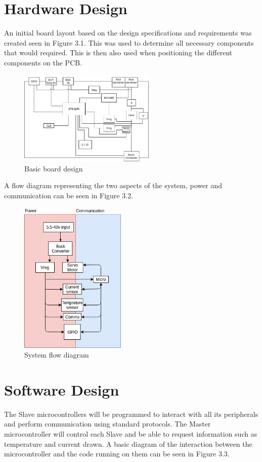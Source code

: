 \section{Hardware Design}
\vspace{-3mm}
An initial board layout based on the design specifications and requirements was created seen in Figure 3.1. This was used to determine all necessary components that would required. This is then also used when positioning the different components on the PCB.
\begin{figure}[H]
\centering
 \includegraphics[width=0.58\textwidth]{My_board.png}
\caption{Basic board design}
\end{figure}  
\vspace{-7mm}
A flow diagram representing the two aspects of the system, power and communication can be seen in Figure 3.2.
\vspace{-2mm}
\begin{figure}[H]
\centering
\includegraphics[width=0.45\textwidth]{System_Flow.jpg}
\caption{System flow diagram}
\label{fig:sysflow}
\end{figure}

\newpage
\section{Software Design}
The Slave microcontrollers will be programmed to interact with all its peripherals and perform communication using standard protocols. The Master microcontroller will control each Slave and be able to request information such as temperature and current drawn. A basic diagram of the interaction between the microcontroller and the code running on them can be seen in Figure 3.3.

